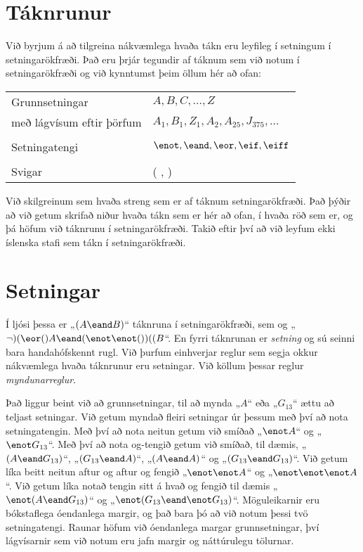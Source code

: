 \section{Táknrunur}
Við byrjum á að tilgreina nákvæmlega hvaða tákn eru leyfileg í setningum í setningarökfræði. Það eru þrjár tegundir af táknum sem við notum í setningarökfræði og við kynntumst þeim öllum hér að ofan:
\begin{center}
\begin{tabular}{l l}
Grunnsetningar & $A,B,C,\ldots,Z$\\
með lágvísum eftir þörfum & $A_1, B_1,Z_1,A_2,A_{25},J_{375},\ldots$\\
\\
Setningatengi & $\enot,\eand,\eor,\eif,\eiff$\\
\\
Svigar &( , )\\
\end{tabular}
\end{center}

Við skilgreinum  sem hvaða streng sem er af táknum setningarökfræði. Það þýðir að við getum skrifað niður hvaða tákn sem er hér að ofan, í hvaða röð sem er, og þá höfum við táknrunu í setningarökfræði. Takið eftir því að við leyfum ekki íslenska stafi sem tákn í setningarökfræði.

\section{Setningar}\label{tfl:SentencesDefined}

Í ljósi þessa er „$(A \eand B)$“ táknruna í setningarökfræði, sem og „$\lnot)(\eor()A\eand(\enot\enot())((B$“. En fyrri táknrunan er \emph{setning} og sú seinni bara handahófskennt rugl. Við þurfum einhverjar reglur sem segja okkur nákvæmlega hvaða táknrunur eru setningar. Við köllum þessar reglur \emph{myndunarreglur}.

Það liggur beint við að grunnsetningar, til að mynda „$A$“ eða „$G_{13}$“ ættu að teljast setningar. Við getum myndað fleiri setningar úr þessum með því að nota setningatengin. Með því að nota neitun getum við smíðað „$\enot A$“ og „$\enot G_{13}$“. Með því að nota og-tengið getum við smíðað, til dæmis, „$(A \eand G_{13})$“, „$(G_{13} \eand A)$“, „$(A \eand A)$“ og „$(G_{13} \eand G_{13})$“. Við getum líka beitt neitun aftur og aftur og fengið „$\enot \enot A$“ og „$\enot \enot \enot A$“. Við getum líka notað tengin sitt á hvað og fengið til dæmis „$\enot(A \eand G_{13})$“ og „$\enot(G_{13} \eand \enot G_{13})$“. Möguleikarnir eru bókstaflega óendanlega margir, og það bara þó að við notum þessi tvö setningatengi. Raunar höfum við óendanlega margar grunnsetningar, því lágvísarnir sem við notum eru jafn margir og náttúrulegu tölurnar.

